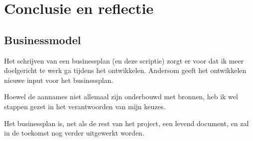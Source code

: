 \section{Conclusie en reflectie}


\subsection{Businessmodel}
\begin{todolist}
  \item Het schrijven van een businessplan (en deze scriptie) zorgt er voor dat ik meer doelgericht te werk ga tijdens het ontwikkelen. Andersom geeft het ontwikkelen nieuwe input voor het businessplan.
  \item Hoewel de aannames niet allemaal zijn onderbouwd met bronnen, heb ik wel stappen gezet in het verantwoorden van mijn keuzes.
  \item Het businessplan is, net als de rest van het project, een levend document, en zal in de toekomst nog verder uitgewerkt worden. 
\end{todolist}


